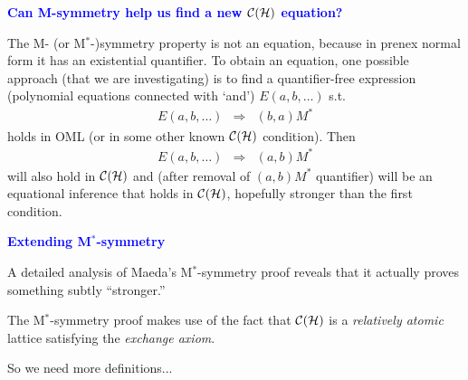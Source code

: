 \documentclass{slides}
\begin{document}
\begin{slide}

\begin{center}
\textcolor{blue}{\textbf{Can M-symmetry help us find a
new ${\cal C}({\cal H})$ equation?}}
\end{center}

The M- (or M${}^*$-)symmetry property is not an equation, because
in prenex normal form it has
an existential quantifier.  To obtain an equation, one possible approach
(that we are investigating)
is to find a quantifier-free expression (polynomial equations
connected with `and') $E(a,b,\ldots )$ s.t.
\begin{eqnarray}
E(a,b,\ldots )  & \Rightarrow & (b,a)M^* \label{mshyp}
\end{eqnarray}
holds in OML (or in some other known ${\cal C}({\cal H})$ condition).  Then
\begin{eqnarray}
E(a,b,\ldots )  & \Rightarrow & (a,b)M^* \label{msconcl}
\end{eqnarray}
will also hold in ${\cal C}({\cal H})$ and (after removal of $(a,b)M^*$
quantifier) will
be an equational inference that holds in ${\cal C}({\cal H})$, hopefully
stronger than the first condition.

\end{slide}
\begin{slide}

\begin{center}
\textcolor{blue}{\textbf{Extending M${}^*$-symmetry}}
\end{center}

A detailed analysis of Maeda's M${}^*$-symmetry proof reveals that it
actually proves something subtly ``stronger.''

The M${}^*$-symmetry proof makes use of the fact that ${\cal C}({\cal
H})$ is a {\em relatively atomic}
 lattice satisfying the {\em exchange axiom}.

So
we need more definitions...

\end{slide}
\end{document}
